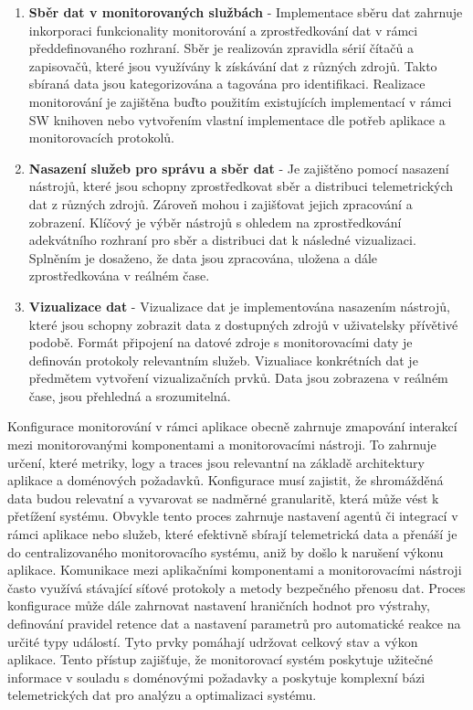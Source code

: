 \begin{enumerate}
    \item \textbf{Sběr dat v monitorovaných službách} - Implementace sběru dat zahrnuje inkorporaci funkcionality monitorování a zprostředkování dat v rámci předdefinovaného rozhraní. Sběr je realizován zpravidla sérií čítačů a zapisovačů, které jsou využívány k získávání dat z různých zdrojů. Takto sbíraná data jsou kategorizována a tagována pro identifikaci. Realizace monitorování je zajištěna buďto použitím existujících implementací v rámci SW knihoven nebo vytvořením vlastní implementace dle potřeb aplikace a monitorovacích protokolů.
    \item \textbf{Nasazení služeb pro správu a sběr dat} - Je zajištěno pomocí nasazení nástrojů, které jsou schopny zprostředkovat sběr a distribuci telemetrických dat z různých zdrojů. Zároveň mohou i zajišťovat jejich zpracování a zobrazení. Klíčový je výběr nástrojů s ohledem na zprostředkování adekvátního rozhraní pro sběr a distribuci dat k následné vizualizaci. Splněním je dosaženo, že data jsou zpracována, uložena a dále zprostředkována v reálném čase.
    \item \textbf{Vizualizace dat} - Vizualizace dat je implementována nasazením nástrojů, které jsou schopny zobrazit data z dostupných zdrojů v uživatelsky přívětivé podobě. Formát připojení na datové zdroje s monitorovacími daty je definován protokoly relevantním služeb. Vizualiace konkrétních dat je předmětem vytvoření vizualizačních prvků. Data jsou zobrazena v reálném čase, jsou přehledná a srozumitelná.
\end{enumerate}

Konfigurace monitorování v rámci aplikace obecně zahrnuje zmapování interakcí mezi monitorovanými komponentami a monitorovacími nástroji. To zahrnuje určení, které metriky, logy a traces jsou relevantní na základě architektury aplikace a doménových požadavků. Konfigurace musí zajistit, že shromážděná data budou relevatní a vyvarovat se nadměrné granularitě, která může vést k přetížení systému. Obvykle tento proces zahrnuje nastavení agentů či integrací v rámci aplikace nebo služeb, které efektivně sbírají telemetrická data a přenáší je do centralizovaného monitorovacího systému, aniž by došlo k narušení výkonu aplikace. Komunikace mezi aplikačními komponentami a monitorovacími nástroji často využívá stávající síťové protokoly a metody bezpečného přenosu dat. Proces konfigurace může dále zahrnovat nastavení hraničních hodnot pro výstrahy, definování pravidel retence dat a nastavení parametrů pro automatické reakce na určité typy událostí. Tyto prvky pomáhají udržovat celkový stav a výkon aplikace. Tento přístup zajišťuje, že monitorovací systém poskytuje užitečné informace v souladu s doménovými požadavky a poskytuje komplexní bázi telemetrických dat pro analýzu a optimalizaci systému. \cite{Blanco2023}